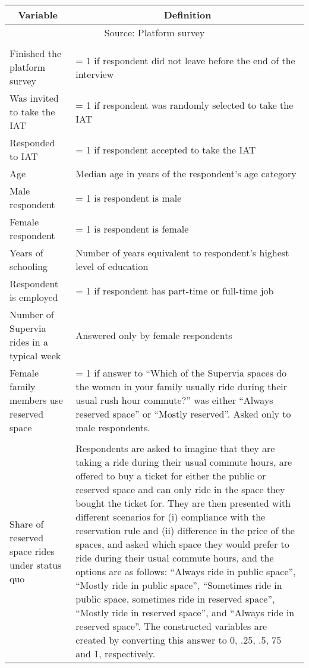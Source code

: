 \begin{table}[H]
    \centering
    \singlespacing
    \footnotesize
    \begin{tabular}{p{.4\linewidth}p{.6\linewidth}}
    \hline\hline 
          \multicolumn{1}{c}{\textbf{Variable}}	&	\multicolumn{1}{c}{\textbf{Definition}}	\\ 
   \hline 
    \multicolumn{2}{c}{Source: Platform survey} \\
    \hline\\[-1.8ex]
Finished the platform survey &	= 1 if respondent did not leave before the end of the interview	\\
Was invited to take the IAT  &	= 1 if respondent was randomly selected to take the IAT	\\
Responded to IAT             &	= 1 if respondent accepted to take the IAT	\\
Age                         & Median age in years of the respondent's age category \\
Male respondent             & = 1 is respondent is male		\\
Female respondent           & = 1 is respondent is female		\\
Years of schooling          & Number of years equivalent to respondent's highest level of education		\\
Respondent is employed      & = 1 if respondent has part-time or full-time job		\\
Number of Supervia rides in a typical week & Answered only by female respondents		\\
Female family members use reserved space & = 1 if answer to ``Which of the Supervia spaces do the women in your family usually ride during their usual rush hour commute?'' was either ``Always reserved space'' or ``Mostly reserved''. Asked only to male respondents.	\\\\[-1.8ex]
Share of reserved space rides under status quo & \multirow{5}{*}{\parbox{\linewidth}{Respondents are asked to imagine that they are taking a ride during their usual commute hours, are offered to buy a ticket for either the public or reserved space and can only ride in the space they bought the ticket for.
They are then presented with different scenarios for (i) compliance with the reservation rule and (ii) difference in the price of the spaces, and asked which space they would prefer to ride during their usual commute hours, and the options are as follows: ``Always ride in public space'', ``Mostly ride in public space'', ``Sometimes ride in public space, sometimes ride in reserved space'', ``Mostly ride in reserved space'', and ``Always ride in reserved space''. The constructed variables are created by converting this answer to 0, .25, .5, 75 and 1, respectively.}}  \\

\end{tabular}
\end{table}
